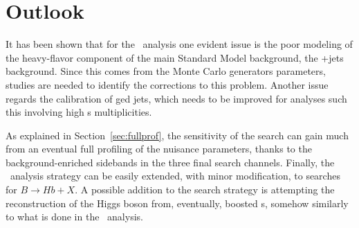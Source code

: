\section{Outlook}\label{sec:htxOUT}

It has been shown that for the \htx\ analysis one evident issue
is the poor modeling of the
heavy-flavor component of the main Standard Model background, the
\ttbar+jets background.
Since this comes from the Monte Carlo generators parameters, 
studies are needed to identify the corrections to this problem.
Another issue regards the calibration of \btag ged jets,
which needs to be improved for analyses such this involving
high \bjet s multiplicities.

As explained in Section~\ref{sec:fullprof}, 
the sensitivity of the search can gain much from an
eventual full profiling of the nuisance parameters, thanks to the
background-enriched sidebands in the three final search channels.
Finally, the \htx\ analysis strategy can be easily
extended, with minor modification, to searches for $B\to Hb+X$.
A possible addition to the search strategy is attempting
the reconstruction of the Higgs boson from, eventually,
boosted \bjet s, somehow similarly to what is done in the
\wbx\ analysis.

